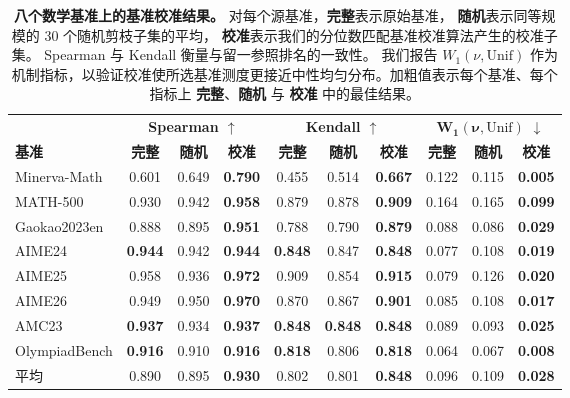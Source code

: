 \begin{table}[t]
\centering
\small
\caption{
\textbf{八个数学基准上的基准校准结果。}
对每个源基准，\textbf{完整}表示原始基准，
\textbf{随机}表示同等规模的 30 个随机剪枝子集的平均，
\textbf{校准}表示我们的分位数匹配基准校准算法产生的校准子集。
Spearman 与 Kendall 衡量与留一参照排名的一致性。
我们报告 \(W_1(\nu,\mathrm{Unif})\) 作为机制指标，以验证校准使所选基准测度更接近中性均匀分布。加粗值表示每个基准、每个指标上 \textbf{完整}、\textbf{随机} 与 \textbf{校准} 中的最佳结果。
}
\label{tab:benchmark_calibration}
\begin{adjustbox}{width=\textwidth}
\begin{tabular}{lccccccccc}
\toprule
& \multicolumn{3}{c}{\textbf{Spearman $\uparrow$}}
& \multicolumn{3}{c}{\textbf{Kendall $\uparrow$}}
& \multicolumn{3}{c}{\(\boldsymbol{W_1(\nu,\mathrm{Unif})}\) \(\boldsymbol{\downarrow}\)} \\
\cmidrule(lr){2-4}
\cmidrule(lr){5-7}
\cmidrule(lr){8-10}
\textbf{基准}
& \textbf{完整} & \textbf{随机} & \textbf{校准}
& \textbf{完整} & \textbf{随机} & \textbf{校准}
& \textbf{完整} & \textbf{随机} & \textbf{校准} \\
\midrule
Minerva-Math  & 0.601 & 0.649 & \textbf{0.790} & 0.455 & 0.514 & \textbf{0.667} & 0.122 & 0.115 & \textbf{0.005} \\
MATH-500      & 0.930 & 0.942 & \textbf{0.958} & 0.879 & 0.878 & \textbf{0.909} & 0.164 & 0.165 & \textbf{0.099} \\
Gaokao2023en  & 0.888 & 0.895 & \textbf{0.951} & 0.788 & 0.790 & \textbf{0.879} & 0.088 & 0.086 & \textbf{0.029} \\
AIME24        & \textbf{0.944} & 0.942 & \textbf{0.944} & \textbf{0.848} & 0.847 & \textbf{0.848} & 0.077 & 0.108 & \textbf{0.019} \\
AIME25        & 0.958 & 0.936 & \textbf{0.972} & 0.909 & 0.854 & \textbf{0.915} & 0.079 & 0.126 & \textbf{0.020} \\
AIME26        & 0.949 & 0.950 & \textbf{0.970} & 0.870 & 0.867 & \textbf{0.901} & 0.085 & 0.108 & \textbf{0.017} \\
AMC23         & \textbf{0.937} & 0.934 & \textbf{0.937} & \textbf{0.848} & \textbf{0.848} & \textbf{0.848} & 0.089 & 0.093 & \textbf{0.025} \\
OlympiadBench & \textbf{0.916} & 0.910 & \textbf{0.916} & \textbf{0.818} & 0.806 & \textbf{0.818} & 0.064 & 0.067 & \textbf{0.008} \\
\midrule
平均       & 0.890 & 0.895 & \textbf{0.930} & 0.802 & 0.801 & \textbf{0.848} & 0.096 & 0.109 & \textbf{0.028} \\
\bottomrule
\end{tabular}
\end{adjustbox}
\end{table}
